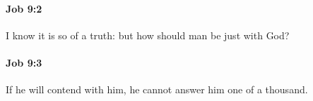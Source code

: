 		\paragraph{Job 9:2} %
			\label{JOB-9-2}

			I know it is so of a truth: but how should man be just with God?


		\paragraph{Job 9:3} %
			\label{JOB-9-3}

			If he will contend with him, he cannot answer him one of a thousand.


